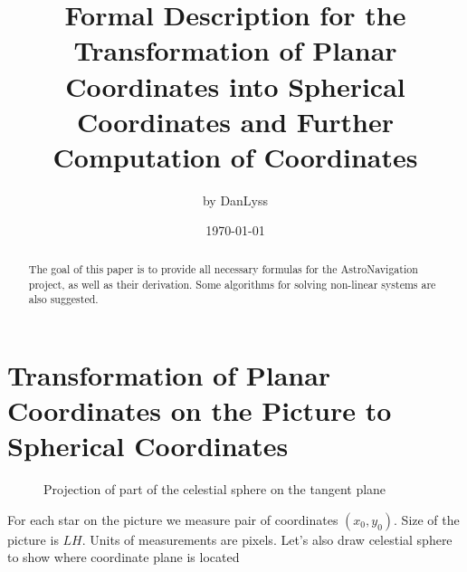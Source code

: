 \documentclass[a4paper,12pt]{article}
\title{Formal Description for the Transformation of Planar Coordinates into Spherical Coordinates and Further Computation of Coordinates}
\author{by DanLyss}
\date{\today}
\begin{document}
\maketitle

\begin{abstract}
   The goal of this paper is to provide all necessary formulas for the AstroNavigation project, as well as their derivation. Some algorithms for solving non-linear systems are also suggested.
\end{abstract}

\section{Transformation of Planar Coordinates on the Picture to Spherical Coordinates}

\begin{figure}[h]
    \centering
 

    \caption{Projection of part of the celestial sphere on the tangent plane}
    \label{fig:coordinate_plane}
\end{figure}
For each star on the picture we measure pair of coordinates \((x_0, y_0)\). Size of the picture is \(L\)\texttimes \(H\). Units of measurements are pixels. Let's also draw celestial sphere to show where coordinate plane is located
\end{document}
